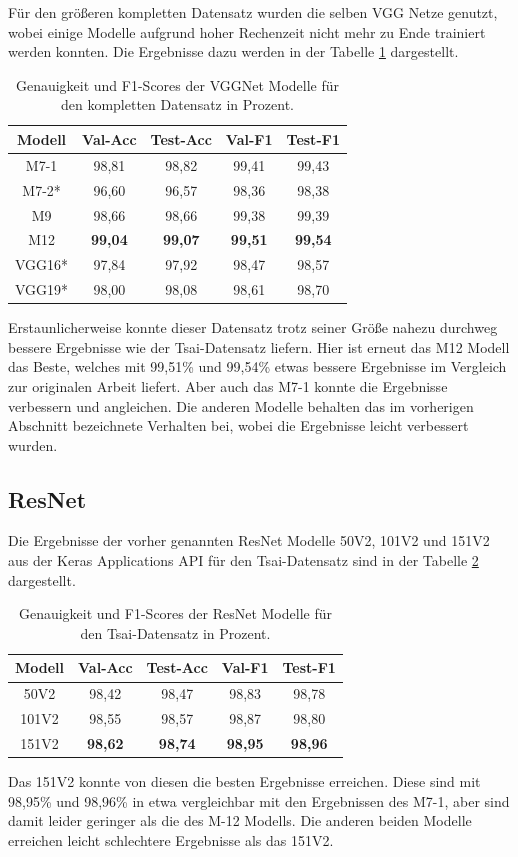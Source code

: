 \documentclass[twoside,a4paper]{IEEEtran}
\begin{document}
Für den größeren kompletten Datensatz wurden die selben VGG Netze genutzt, wobei einige Modelle aufgrund hoher Rechenzeit nicht mehr zu Ende trainiert werden konnten. Die Ergebnisse dazu werden in der Tabelle \ref{vgg_ergebnis_full} dargestellt.
\begin{table}[!htb]
	\caption{Genauigkeit und F1-Scores der VGGNet Modelle für den kompletten Datensatz in Prozent.}
	\label{vgg_ergebnis_full}
	\centering
	\begin{tabular}{|c|c|c|c|c|}
		\hline
		Modell & Val-Acc & Test-Acc & Val-F1 & Test-F1\\
		\hline 
		\hline 
		M7-1 & 98,81 & 98,82 & 99,41 & 99,43\\
		\hline
		M7-2* & 96,60 & 96,57 & 98,36 & 98,38\\
		\hline
		M9 & 98,66 & 98,66 & 99,38 & 99,39\\
		\hline 
		M12 & \textbf{99,04} & \textbf{99,07} & \textbf{99,51} & \textbf{99,54}\\
		\hline 
		VGG16* & 97,84 & 97,92 & 98,47 & 98,57\\
		\hline 
		VGG19* & 98,00 & 98,08 & 98,61 & 98,70\\
		\hline 
	\end{tabular}
\end{table}

Erstaunlicherweise konnte dieser Datensatz trotz seiner Größe nahezu durchweg bessere Ergebnisse wie der Tsai-Datensatz liefern. Hier ist erneut das M12 Modell das Beste, welches mit 99,51\% und 99,54\% etwas bessere Ergebnisse im Vergleich zur originalen Arbeit liefert. Aber auch das M7-1 konnte die Ergebnisse verbessern und angleichen. Die anderen Modelle behalten das im vorherigen Abschnitt bezeichnete Verhalten bei, wobei die Ergebnisse leicht verbessert wurden.
\subsection{ResNet}

Die Ergebnisse der vorher genannten ResNet Modelle 50V2, 101V2 und 151V2 aus der Keras Applications API für den Tsai-Datensatz sind in der Tabelle \ref{resnet_ergebnis_tsai} dargestellt.
\begin{table}[!htb]
	\caption{Genauigkeit und F1-Scores der ResNet Modelle für den Tsai-Datensatz in Prozent.}
	\label{resnet_ergebnis_tsai}
	\centering
	\begin{tabular}{|c|c|c|c|c|}
		\hline
		Modell & Val-Acc & Test-Acc & Val-F1 & Test-F1\\
		\hline
		\hline
	 	50V2 & 98,42 & 98,47 & 98,83 & 98,78\\
		\hline
		101V2 & 98,55 & 98,57 & 98,87 & 98,80\\
		\hline
		151V2 & \textbf{98,62} & \textbf{98,74} & \textbf{98,95} & \textbf{98,96}\\
		\hline 
	\end{tabular}
\end{table} 
Das 151V2 konnte von diesen die besten Ergebnisse erreichen. Diese sind mit 98,95\% und 98,96\% in etwa vergleichbar mit den Ergebnissen des M7-1, aber sind damit leider geringer als die des M-12 Modells. Die anderen beiden Modelle erreichen leicht schlechtere Ergebnisse als das 151V2. 
\end{document}
